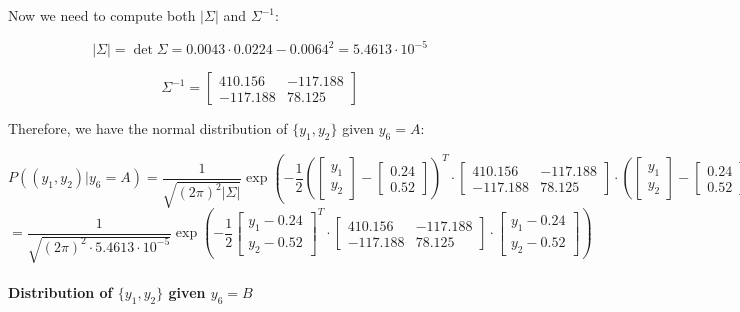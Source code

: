 \documentclass{article}
\begin{document}
Now we need to compute both $|\Sigma|$ and $\Sigma^{-1}$:

\[
  |\Sigma| = \det \Sigma = 0.0043 \cdot 0.0224 - 0.0064^2 = 5.4613 \cdot 10^{-5}
\]

\[
  \Sigma^{-1} = \begin{bmatrix}
    410.156 & -117.188 \\
    -117.188 & 78.125
  \end{bmatrix}
\]

Therefore, we have the normal distribution of $\{y_1,y_2\}$ given $y_6=A$:

\[
    P((y_1,y_2)|y_6=A) = \frac{1}{\sqrt{(2\pi)^2 |\Sigma|}} \exp \left( -\frac{1}{2} \left(\begin{bmatrix} y_1 \\ y_2 \end{bmatrix} - \begin{bmatrix} 0.24 \\ 0.52 \end{bmatrix}\right)^T \cdot \begin{bmatrix}
    410.156 & -117.188 \\
    -117.188 & 78.125
  \end{bmatrix} \cdot \left(\begin{bmatrix} y_1 \\ y_2 \end{bmatrix} - \begin{bmatrix} 0.24 \\ 0.52 \end{bmatrix}\right) \right)
\]
\[
  = \frac{1}{\sqrt{(2\pi)^2 \cdot 5.4613 \cdot 10^{-5}}} \exp \left( -\frac{1}{2} \left[ \begin{matrix} y_1 - 0.24 \\ y_2 - 0.52 \end{matrix} \right]^T \cdot \begin{bmatrix}
    410.156 & -117.188 \\
    -117.188 & 78.125  
  \end{bmatrix} \cdot \left[ \begin{matrix} y_1 - 0.24 \\ y_2 - 0.52 \end{matrix} \right] \right)
\]




\paragraph{Distribution of $\{y_1,y_2\}$ given $y_6=B$}
\paragraph{}
\end{document}
